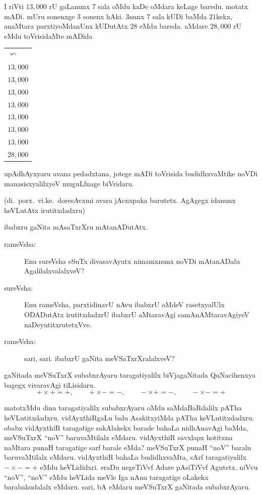 \noindent
\begin{minipage}[c]{5.5cm}
\qquad I riVti $13,000$ rU gaLanunx $7$ sala oMdu kaDe oMdara keLage baredu. motatx mADi. mUru sonenxge $3$ sonenx hAki. $3$nunx $7$ sala kUDi baMda $21$kekx, anaMtara parxtiyoMdanUnx kUDutAtx $28$ eMdu bareda. aMdare $28,000$ rU eMdu toVrisidaMte mADida
\end{minipage}
\quad
\begin{minipage}[c]{4cm}
\begin{center}
\begin{tabular}{l}
$\curvearrowleft$\\
$13,000$\\
$13,000$\\
$13,000$\\
$13,000$\\
$13,000$\\
$13,000$\\
$13,000$\\
\hline
$28,000$
\end{tabular}
\end{center}
\end{minipage}

\smallskip

upAdhAyxyaru avana pedadxtana, jotege mADi toVrisida budidhxvaMtike noVDi manasisxyalilxyeV muguLfnage biVridaru.

(di.\ porx.\ vi.ke.\ doresAvxmi avara jAcnxpaka barutetx. AgAgegx idanunx heVLutAtx irutitxdadxru)

\medskip

ibabxru gaNita mAsaTxrXru mAtanADutAtx.
\begin{description}
\item[rameVsha:] Enu sureVsha eSuTx divasavAyutx nimamxnunx noVDi mAtanADalu AgalilalxvalalxveV?

\item[sureVsha:] Enu rameVsha, parxtidinavU nAvu ibabxrU oMdeV rasetxyalUlx ODADutAtx irutitxdadxrU ibabxrU aMtaravAgi samAnAMtaravAgiyeV naDeyutitxrutetxVve.

\item[rameVsha:] sari, sari. ibabxrU gaNita meVSaTxrXralalxveV?
\end{description}

\eject

gaNitada meVSuTxrX subabxrAyaru taragatiyalilx biVjagaNitada QuNacihenxya bagegx vivaravAgi tiLisidaru.
$$
+\times+=+,\qquad +\times-=-,\qquad -\times+=-,\qquad -\times -=+
$$

matotxMdu dina taragatiyalilx subabxrAyaru oMdu saMdaBaRdalilx pATha heVLutitxdadxru. vidAyxthiRgaLu balu AsakitxyiMda pATha keVLutitxdadxru. obabx vidAyxthiR taragatige sakAlakekx barade bahaLa nidhAnavAgi baMda, meVSuTxrX ``noV'' baruvaMtilalx eMdaru. vidAyxthiR savxlapx hotitxna naMtara punaH taragatige sarf barale eMda? meVSuTxrX punaH ``noV'' baralu baruvaMtilalx eMdaru. vidAyxthiR bahaLa budidhxvaMta, sArf taragatiyalilx $-\times-=+$ eMdu heVLididxri. eraDu negeTiVvf Adare pAsiTiVvf Agutetx. niVvu ``noV'', ``noV'' eMdu heVLida meVle Iga nAnu taragatige oLakekx barabahudalalx eMdaru. sari, bA eMdaru meVSuTxrX gaNitada subabxrAyaru.

